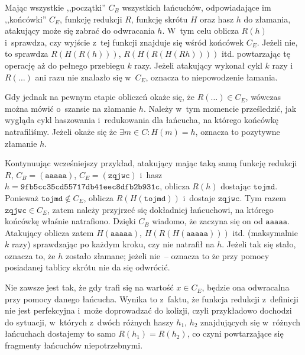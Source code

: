 Mając wszystkie ,,początki'' $C_B$ wszystkich łańcuchów, odpowiadające im
,,końcówki'' $C_E$, funkcję redukcji $R$, funkcję skrótu $H$ oraz hasz $h$ do
złamania, atakujący może się zabrać do odwracania $h$. W~tym celu oblicza
$R(h)$ i~sprawdza, czy wyjście z~tej funkcji znajduje się wśród końcówek $C_E$.
Jeżeli nie, to sprawdza $R(H(R(h)))$, $R(H(R(H(Rh))))$ itd. powtarzając tę
operację aż do pełnego przebiegu $k$ razy. Jeżeli atakujący wykonał cykl $k$
razy i~$R(\ldots)$ ani razu nie znalazło się w~$C_E$, oznacza to niepowodzenie
łamania.

Gdy jednak na pewnym etapie obliczeń okaże się, że $R(\ldots) \in C_E$, wówczas
można mówić o~szansie na złamanie $h$. Należy w~tym momencie prześledzić, jak
wygląda cykl haszowania i~redukowania dla łańcucha, na którego końcówkę
natrafiliśmy. Jeżeli okaże się że $\exists m \in C : H(m) = h$, oznacza to
pozytywne złamanie $h$.

Kontynuując wcześniejszy przykład, atakujący mając taką samą funkcję redukcji
$R$, $C_B = (\mathtt{aaaaa})$, $C_E = (\mathtt{zqjwc})$ i~hasz
$h=\mathtt{9fb5cc35cd55717db41eec8dfb2b931c}$, oblicza $R(h)$ dostając
$\mathtt{tojmd}$. Ponieważ $\mathtt{tojmd} \not\in C_E$, oblicza
$R(H(\mathtt{tojmd}))$ i~dostaje $\mathtt{zqjwc}$. Tym razem $\mathtt{zqjwc}
\in C_E$, zatem należy przyjrzeć się dokładniej łańcuchowi, na którego końcówkę
właśnie natrafiono. Dzięki $C_B$ wiadomo, że zaczyna się on od
$\mathtt{aaaaa}$. Atakujący oblicza zatem $H(\mathtt{aaaaa})$,
$H(R(H(\mathtt{aaaaa})))$ itd. (maksymalnie $k$ razy) sprawdzając po każdym
kroku, czy nie natrafił na $h$. Jeżeli tak się stało, oznacza to, że $h$
zostało złamane; jeżeli nie~-- oznacza to że przy pomocy posiadanej tablicy
skrótu nie da się odwrócić.

Nie zawsze jest tak, że gdy trafi się na wartość $x \in C_E$, będzie ona
odwracalna przy pomocy danego łańcucha. Wynika to z~faktu, że funkcja redukcji
z~definicji nie jest perfekcyjna i~może doprowadzać do kolizji, czyli
przykładowo dochodzi do sytuacji, w~których z~dwóch różnych haszy $h_1$, $h_2$
znajdujących się w~różnych łańcuchach dostajemy to samo $R(h_1) = R(h_2)$, co
czyni powtarzające się fragmenty łańcuchów niepotrzebnymi.

